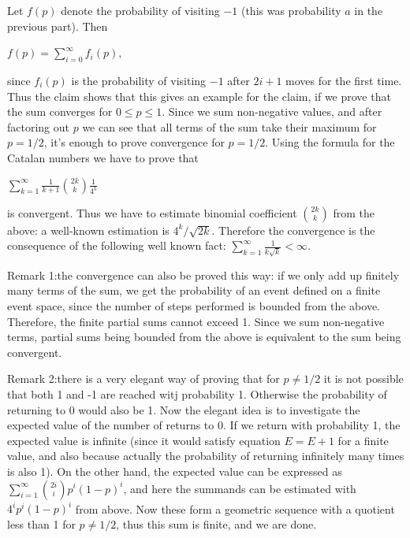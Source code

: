 \documentclass{article}
\begin{document}
Let \(\displaystyle f(p)\) denote the probability of visiting \(\displaystyle -1\) (this was probability \(\displaystyle a\) in the previous part). Then

\(\displaystyle 
f(p)=\sum_{i=0}^\infty f_i(p),
\)

since \(\displaystyle f_i(p)\) is the probability of visiting \(\displaystyle -1\) after \(\displaystyle 2i+1\) moves for the first time. Thus the claim shows that this gives an example for the claim, if we prove that the sum converges for \(\displaystyle 0\le p\le 1\). Since we sum non-negative values, and after factoring out \(\displaystyle p\) we can see that all terms of the sum take their maximum for \(\displaystyle p=1/2\), it's enough to prove convergence for \(\displaystyle p=1/2\). Using the formula for the Catalan numbers we have to prove that

\(\displaystyle 
\sum\limits_{k=1}^{\infty} \frac{1}{k+1}\binom{2k}{k}\frac{1}{4^k}
\)

is convergent. Thus we have to estimate binomial coefficient \(\displaystyle \binom{2k}{k}\) from the above: a well-known estimation is \(\displaystyle 4^k/\sqrt{2k}\). Therefore the convergence is the consequence of the following well known fact: \(\displaystyle \sum_{k=1}^{\infty}\frac{1}{k\sqrt{k}}<\infty\).

Remark 1:the convergence can also be proved this way: if we only add up finitely many terms of the sum, we get the probability of an event defined on a finite event space, since the number of steps performed is bounded from the above. Therefore, the finite partial sums cannot exceed 1. Since we sum non-negative terms, partial sums being bounded from the above is equivalent to the sum being convergent.

Remark 2:there is a very elegant way of proving that for \(\displaystyle p\neq 1/2\) it is not possible that both 1 and -1 are reached witj probability 1. Otherwise the probability of returning to 0 would also be 1. Now the elegant idea is to investigate the expected value of the number of returns to 0. If we return with probability 1, the expected value is infinite (since it would  satisfy equation \(\displaystyle E=E+1\) for a finite value, and also because actually the probability of returning infinitely many times is also 1). On the other hand, the expected value can be expressed as \(\displaystyle \sum_{i=1}^{\infty} \binom{2i}{i}p^i(1-p)^i\), and here the summands can be estimated with \(\displaystyle 4^ip^i(1-p)^i\) from above. Now these form a geometric sequence with a quotient less than 1 for \(\displaystyle p\neq 1/2\), thus this sum is finite, and we are done.
\end{document}
